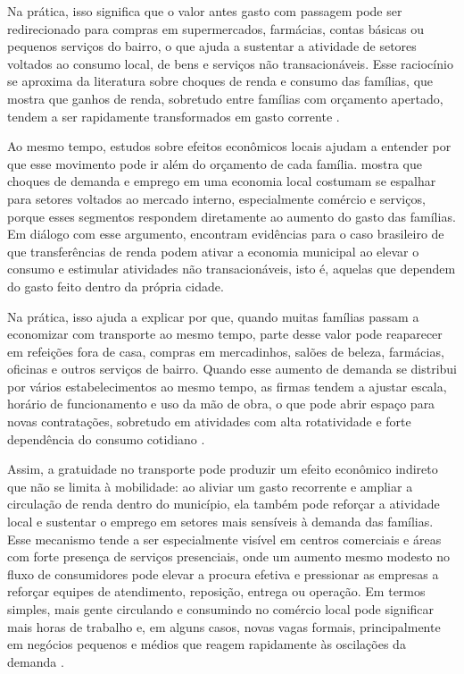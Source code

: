 \documentclass[12pt, a4paper]{article}
\begin{document}
Na prática, isso significa que o valor antes gasto com passagem pode ser redirecionado para compras em supermercados, farmácias, contas básicas ou pequenos serviços do bairro, o que ajuda a sustentar a atividade de setores voltados ao consumo local, de bens e serviços não transacionáveis.
Esse raciocínio se aproxima da literatura sobre choques de renda e consumo das famílias, que mostra que ganhos de renda, sobretudo entre famílias com orçamento apertado, tendem a ser rapidamente transformados em gasto corrente \citep{CrawleyTheloudis2024}.

Ao mesmo tempo, estudos sobre efeitos econômicos locais ajudam a entender por que esse movimento pode ir além do orçamento de cada família.
\citet{moretti2010} mostra que choques de demanda e emprego em uma economia local costumam se espalhar para setores voltados ao mercado interno, especialmente comércio e serviços, porque esses segmentos respondem diretamente ao aumento do gasto das famílias.
Em diálogo com esse argumento, \citet{GerardNaritomiSilva2021} encontram evidências para o caso brasileiro de que transferências de renda podem ativar a economia municipal ao elevar o consumo e estimular atividades não transacionáveis, isto é, aquelas que dependem do gasto feito dentro da própria cidade.

Na prática, isso ajuda a explicar por que, quando muitas famílias passam a economizar com transporte ao mesmo tempo, parte desse valor pode reaparecer em refeições fora de casa, compras em mercadinhos, salões de beleza, farmácias, oficinas e outros serviços de bairro.
Quando esse aumento de demanda se distribui por vários estabelecimentos ao mesmo tempo, as firmas tendem a ajustar escala, horário de funcionamento e uso da mão de obra, o que pode abrir espaço para novas contratações, sobretudo em atividades com alta rotatividade e forte dependência do consumo cotidiano \citep{moretti2010, GerardNaritomiSilva2021}.

Assim, a gratuidade no transporte pode produzir um efeito econômico indireto que não se limita à mobilidade: ao aliviar um gasto recorrente e ampliar a circulação de renda dentro do município, ela também pode reforçar a atividade local e sustentar o emprego em setores mais sensíveis à demanda das famílias.
Esse mecanismo tende a ser especialmente visível em centros comerciais e áreas com forte presença de serviços presenciais, onde um aumento mesmo modesto no fluxo de consumidores pode elevar a procura efetiva e pressionar as empresas a reforçar equipes de atendimento, reposição, entrega ou operação.
Em termos simples, mais gente circulando e consumindo no comércio local pode significar mais horas de trabalho e, em alguns casos, novas vagas formais, principalmente em negócios pequenos e médios que reagem rapidamente às oscilações da demanda \citep{moretti2010, GerardNaritomiSilva2021}.
\end{document}
